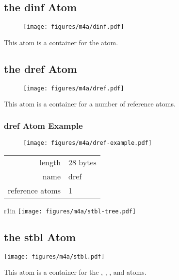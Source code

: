\clearpage

\subsection{the dinf Atom}
\label{atom:dinf}
\begin{figure}[h]
  \texttt{[image: figures/m4a/dinf.pdf]}
\end{figure}
\par
\noindent
This atom is a container for the \hyperref[atom:dref]{} atom.

\subsection{the dref Atom}
\label{atom:dref}
\begin{figure}[h]
\texttt{[image: figures/m4a/dref.pdf]}
\end{figure}
\par
\noindent
This atom is a container for a number of reference atoms.

\subsubsection{dref Atom Example}
\begin{figure}[h]
  \texttt{[image: figures/m4a/dref-example.pdf]}
\end{figure}
\begin{tabular}{rl}
  \textsf{length} & 28 bytes \\
  \textsf{name} & \textsf{dref} \\
  \textsf{reference atoms} & 1 \\
\end{tabular}

\clearpage

\begin{wrapfigure}[5]{r}{1in}
  \texttt{[image: figures/m4a/stbl-tree.pdf]}
\end{wrapfigure}
\begin{minipage}[t]{4.75in}
\subsection{the stbl Atom}
\label{atom:stbl}
\texttt{[image: figures/m4a/stbl.pdf]}
\par
\noindent
This atom is a container for the
\hyperref[atom:stsd]{},
\hyperref[atom:stts]{},
\hyperref[atom:stsc]{},
\hyperref[atom:stsz]{} and
\hyperref[atom:stco]{} atoms.
\end{minipage}


